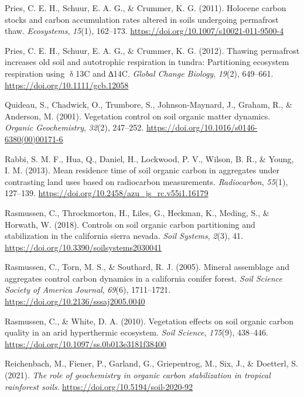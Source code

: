 \documentclass[]{article}
\begin{document}
\leavevmode\hypertarget{ref-Hicks_Pries_2011}{}%
Pries, C. E. H., Schuur, E. A. G., \& Crummer, K. G. (2011). Holocene
carbon stocks and carbon accumulation rates altered in soils undergoing
permafrost thaw. \emph{Ecosystems}, \emph{15}(1), 162--173.
\url{https://doi.org/10.1007/s10021-011-9500-4}

\leavevmode\hypertarget{ref-Hicks_Pries_2012}{}%
Pries, C. E. H., Schuur, E. A. G., \& Crummer, K. G. (2012). Thawing
permafrost increases old soil and autotrophic respiration in tundra:
Partitioning ecosystem respiration using \(\updelta\)13C and ∆14C.
\emph{Global Change Biology}, \emph{19}(2), 649--661.
\url{https://doi.org/10.1111/gcb.12058}

\leavevmode\hypertarget{ref-Quideau_2001}{}%
Quideau, S., Chadwick, O., Trumbore, S., Johnson-Maynard, J., Graham,
R., \& Anderson, M. (2001). Vegetation control on soil organic matter
dynamics. \emph{Organic Geochemistry}, \emph{32}(2), 247--252.
\url{https://doi.org/10.1016/s0146-6380(00)00171-6}

\leavevmode\hypertarget{ref-Rabbi_2013}{}%
Rabbi, S. M. F., Hua, Q., Daniel, H., Lockwood, P. V., Wilson, B. R., \&
Young, I. M. (2013). Mean residence time of soil organic carbon in
aggregates under contrasting land uses based on radiocarbon
measurements. \emph{Radiocarbon}, \emph{55}(1), 127--139.
\url{https://doi.org/10.2458/azu_js_rc.v55i1.16179}

\leavevmode\hypertarget{ref-Rasmussen_2018}{}%
Rasmussen, C., Throckmorton, H., Liles, G., Heckman, K., Meding, S., \&
Horwath, W. (2018). Controls on soil organic carbon partitioning and
stabilization in the california sierra nevada. \emph{Soil Systems},
\emph{2}(3), 41. \url{https://doi.org/10.3390/soilsystems2030041}

\leavevmode\hypertarget{ref-Rasmussen_2005}{}%
Rasmussen, C., Torn, M. S., \& Southard, R. J. (2005). Mineral
assemblage and aggregates control carbon dynamics in a california
conifer forest. \emph{Soil Science Society of America Journal},
\emph{69}(6), 1711--1721. \url{https://doi.org/10.2136/sssaj2005.0040}

\leavevmode\hypertarget{ref-Rasmussen_2010}{}%
Rasmussen, C., \& White, D. A. (2010). Vegetation effects on soil
organic carbon quality in an arid hyperthermic ecosystem. \emph{Soil
Science}, \emph{175}(9), 438--446.
\url{https://doi.org/10.1097/ss.0b013e3181f38400}

\leavevmode\hypertarget{ref-Reichenbach_2021}{}%
Reichenbach, M., Fiener, P., Garland, G., Griepentrog, M., Six, J., \&
Doetterl, S. (2021). \emph{The role of geochemistry in organic carbon
stabilization in tropical rainforest soils}.
\url{https://doi.org/10.5194/soil-2020-92}
\end{document}
